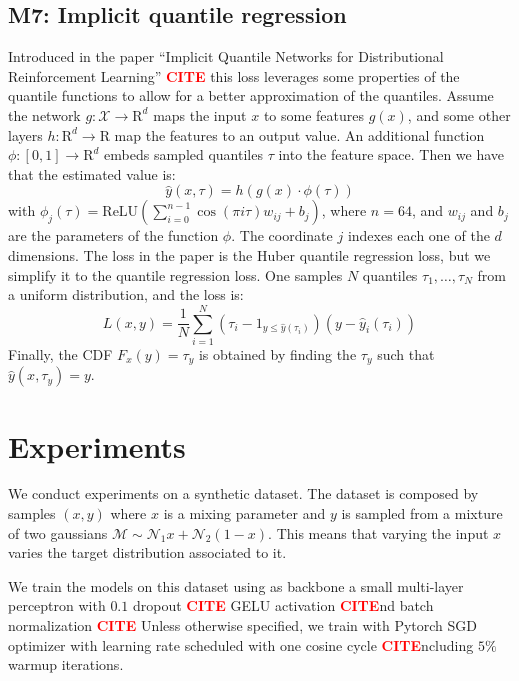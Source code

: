 \documentclass{article}
\newcommand{\citee}[1]{\textbf{\textcolor{red}{CITE}}}
\begin{document}
\subsection{M7: Implicit quantile regression}
Introduced in the paper ``Implicit Quantile Networks for Distributional Reinforcement Learning'' \citee, this loss leverages some properties of the quantile functions to allow for a better approximation of the quantiles. Assume the network $g : \mathcal{X} \to \mathrm{R}^d$ maps the input $x$ to some features $g(x)$, and some other layers $h: \mathrm{R}^d \to \mathrm{R}$ map the features to an output value. An additional function $\phi : [0,1] \to \mathrm{R}^d$ embeds sampled quantiles $\tau$ into the feature space. Then we have that the estimated value is:
\begin{equation}
    \hat y (x, \tau) = h(g(x) \cdot \phi(\tau))
\end{equation}
with $\phi_j(\tau) = \text{ReLU}\left(\sum_{i=0}^{n-1} \cos(\pi i \tau) w_{ij} + b_j\right)$, where $n=64$, and $w_{ij}$ and $b_j$ are the parameters of the function $\phi$. The coordinate $j$ indexes each one of the $d$ dimensions.
The loss in the paper is the Huber quantile regression loss, but we simplify it to the quantile regression loss. One samples $N$ quantiles $\tau_1, \dots, \tau_N$ from a uniform distribution, and the loss is:
\begin{equation}
    L(x, y) = \frac{1}{N} \sum_{i=1}^N (\tau_i - \mathrm{1}_{y \leq \hat y (\tau_i)})(y - \hat{y}_i(\tau_i))
\end{equation}
Finally, the CDF $F_x(y)=\tau_y$ is obtained by finding the $\tau_y$ such that $\hat y(x, \tau_y) = y$.



\section{Experiments}
We conduct experiments on a synthetic dataset. The dataset is composed by samples $(x, y)$ where $x$ is a mixing parameter and $y$ is sampled from a mixture of two gaussians $\mathcal{M}\sim \mathcal{N}_1 x + \mathcal{N}_2 (1-x)$. This means that varying the input $x$ varies the target distribution associated to it. 

We train the models on this dataset using as backbone a small multi-layer perceptron with $0.1$ dropout \citee, GELU activation \citee and batch normalization \citee. Unless otherwise specified, we train with Pytorch SGD optimizer with learning rate scheduled with one cosine cycle \citee including $5\%$ warmup iterations. 
\end{document}
